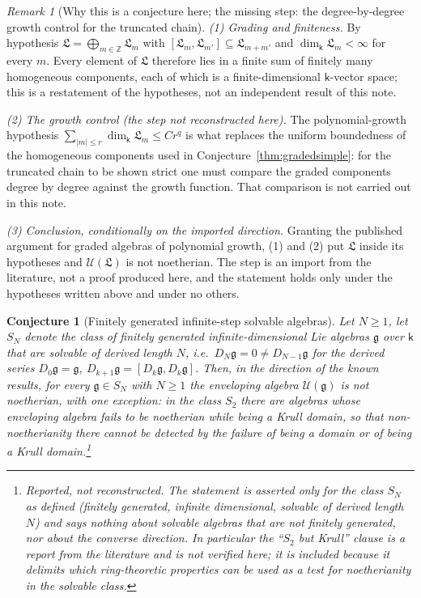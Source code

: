 \documentclass[11pt]{ctexart}
\theoremstyle{plain}
\newtheorem{conjecture}[theorem]{Conjecture}
\theoremstyle{definition}
\theoremstyle{remark}
\newtheorem{remark}[theorem]{Remark}
\newcommand{\kk}{\mathsf{k}}
\newcommand{\gl}{\mathfrak{g}}
\newcommand{\LL}{\mathfrak{L}}
\newcommand{\UU}{\mathcal{U}}
\begin{document}
\begin{remark}[Why this is a conjecture here; the missing step: the degree-by-degree growth control for the truncated chain]\label{rem:poly-missing}
\emph{(1) Grading and finiteness.} By hypothesis $\LL=\bigoplus_{m\in\mathbb{Z}}\LL_m$
with $[\LL_m,\LL_{m'}]\subseteq\LL_{m+m'}$ and $\dim_\kk\LL_m<\infty$ for every $m$.
Every element of $\LL$ therefore lies in a finite sum of finitely many homogeneous
components, each of which is a finite-dimensional $\kk$-vector space; this is a
restatement of the hypotheses, not an independent result of this note.

\emph{(2) The growth control (the step not reconstructed here).} The polynomial-growth
hypothesis $\sum_{|m|\le r}\dim_\kk\LL_m\le Cr^{q}$ is what replaces the uniform
boundedness of the homogeneous components used in
Conjecture~\ref{thm:gradedsimple}: for the truncated chain to be shown strict one must
compare the graded components degree by degree against the growth function. That
comparison is not carried out in this note.

\emph{(3) Conclusion, conditionally on the imported direction.} Granting the published
argument for graded algebras of polynomial growth, (1) and (2) put $\LL$ inside its
hypotheses and $\UU(\LL)$ is not noetherian. The step is an import from the literature,
not a proof produced here, and the statement holds only under the hypotheses written
above and under no others.
\end{remark}

\begin{conjecture}[Finitely generated infinite-step solvable algebras]\label{thm:solvable}
Let $N\ge1$, let $S_N$ denote the class of finitely generated infinite-dimensional
Lie algebras $\gl$ over $\kk$ that are solvable of derived length $N$, i.e.\
$D_N\gl=0\neq D_{N-1}\gl$ for the derived series $D_0\gl=\gl$,
$D_{k+1}\gl=[D_k\gl,D_k\gl]$. Then, in the direction of the known results, for every
$\gl\in S_N$ with $N\ge1$ the enveloping algebra $\UU(\gl)$ is not noetherian, with one
exception: in the class $S_2$ there are algebras whose enveloping algebra fails to be
noetherian while being a Krull domain, so that non-noetherianity there cannot be
detected by the failure of being a domain or of being a Krull domain.\footnote{Reported, not reconstructed. The statement is asserted only for the class $S_N$
as defined (finitely generated, infinite dimensional, solvable of derived length $N$)
and says nothing about solvable algebras that are not finitely generated, nor about the
converse direction. In particular the ``$S_2$ but Krull'' clause is a report from the
literature and is not verified here; it is included because it delimits which
ring-theoretic properties can be used as a test for noetherianity in the solvable
class.}
\end{conjecture}
\end{document}
